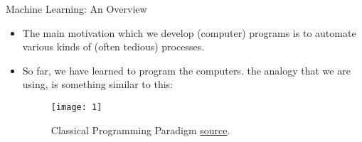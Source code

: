 \documentclass[compress,oilve]{beamer}
\begin{document}


\begin{frame}{Machine Learning: An Overview}
\begin{itemize}
\item The main motivation which we develop (computer) programs is to automate various
kinds of (often tedious) processes.
\item So far, we have learned to program the computers. the analogy that we are using, is something similar to this:\\

\begin{center}
\begin{figure}
\texttt{[image: 1]}
\caption{Classical Programming Paradigm \href{https://sebastianraschka.com/faq/docs/datascience-ml.html}{source}.}
\end{figure}
\end{center}
\end{itemize}
\end{frame}
\end{document}

